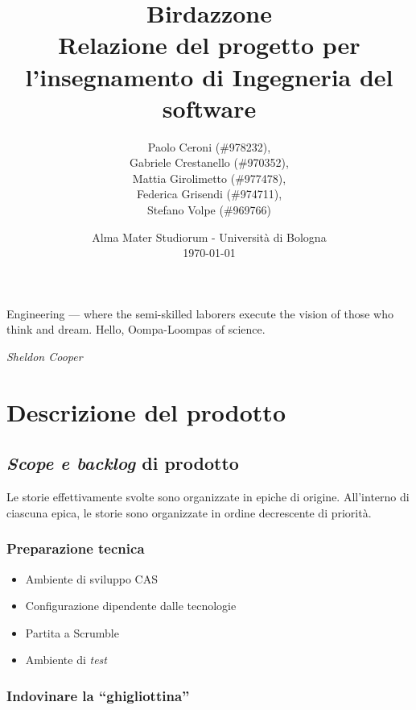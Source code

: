 \documentclass{article}
\title{
	\textbf{
		Birdazzone \\
	}
	\textbf{\large
		Relazione del progetto per l'insegnamento di \break
		Ingegneria del software
	}
}
\author{
	Paolo Ceroni (\#978232), \\
	Gabriele Crestanello (\#970352), \\
	Mattia Girolimetto (\#977478), \\
	Federica Grisendi (\#974711), \\
	Stefano Volpe (\#969766)
}
\date{
	Alma Mater Studiorum - Universit\`a di Bologna \\
	\today
}
\begin{document}
\maketitle

\epigraph{
	Engineering --- where the semi-skilled laborers execute the vision of those
	who think and dream. Hello, Oompa-Loompas of science.
}{\textit{Sheldon Cooper}}

\thispagestyle{empty}
\pagebreak

\tableofcontents

\pagebreak

\section{Descrizione del prodotto}

\subsection{\emph{Scope e backlog} di prodotto}

Le storie effettivamente svolte sono organizzate in epiche di origine.
All'interno di ciascuna epica, le storie sono organizzate in ordine decrescente
di priorità.

\subsubsection{Preparazione tecnica}

\begin{itemize}
	\item Ambiente di sviluppo CAS
	\item Configurazione dipendente dalle tecnologie
	\item Partita a Scrumble
	\item Ambiente di \emph{test}
\end{itemize}

\subsubsection{Indovinare la ``ghigliottina''}
\end{document}
